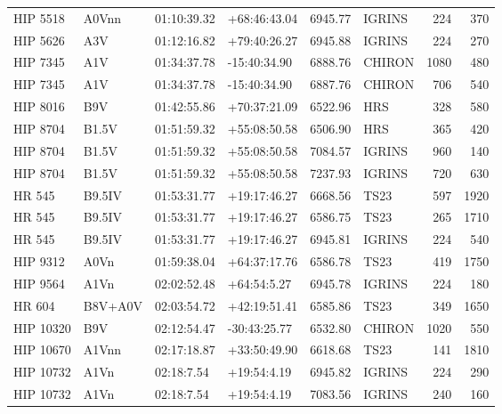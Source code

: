 \documentclass{emulateapj}
\begin{document}
\begin{longtable*}{|l|lllrlrr|}
    HIP 5518 &          A0Vnn &    01:10:39.32 &   +68:46:43.04 &  6945.77 &     IGRINS &      224 &     370 \\
    HIP 5626 &            A3V &    01:12:16.82 &   +79:40:26.27 &  6945.88 &     IGRINS &      224 &     270 \\
    HIP 7345 &            A1V &    01:34:37.78 &   -15:40:34.90 &  6888.76 &     CHIRON &     1080 &     480 \\
    HIP 7345 &            A1V &    01:34:37.78 &   -15:40:34.90 &  6887.76 &     CHIRON &      706 &     540 \\
    HIP 8016 &            B9V &    01:42:55.86 &   +70:37:21.09 &  6522.96 &        HRS &      328 &     580 \\
    HIP 8704 &          B1.5V &    01:51:59.32 &   +55:08:50.58 &  6506.90 &        HRS &      365 &     420 \\
    HIP 8704 &          B1.5V &    01:51:59.32 &   +55:08:50.58 &  7084.57 &     IGRINS &      960 &     140 \\
    HIP 8704 &          B1.5V &    01:51:59.32 &   +55:08:50.58 &  7237.93 &     IGRINS &      720 &     630 \\
      HR 545 &         B9.5IV &    01:53:31.77 &   +19:17:46.27 &  6668.56 &       TS23 &      597 &    1920 \\
      HR 545 &         B9.5IV &    01:53:31.77 &   +19:17:46.27 &  6586.75 &       TS23 &      265 &    1710 \\
      HR 545 &         B9.5IV &    01:53:31.77 &   +19:17:46.27 &  6945.81 &     IGRINS &      224 &     540 \\
    HIP 9312 &           A0Vn &    01:59:38.04 &   +64:37:17.76 &  6586.78 &       TS23 &      419 &    1750 \\
    HIP 9564 &           A1Vn &    02:02:52.48 &    +64:54:5.27 &  6945.78 &     IGRINS &      224 &     180 \\
      HR 604 &        B8V+A0V &    02:03:54.72 &   +42:19:51.41 &  6585.86 &       TS23 &      349 &    1650 \\
   HIP 10320 &            B9V &    02:12:54.47 &   -30:43:25.77 &  6532.80 &     CHIRON &     1020 &     550 \\
   HIP 10670 &          A1Vnn &    02:17:18.87 &   +33:50:49.90 &  6618.68 &       TS23 &      141 &    1810 \\
   HIP 10732 &           A1Vn &     02:18:7.54 &    +19:54:4.19 &  6945.82 &     IGRINS &      224 &     290 \\
   HIP 10732 &           A1Vn &     02:18:7.54 &    +19:54:4.19 &  7083.56 &     IGRINS &      240 &     160 \\

\end{longtable*}
\end{document}
